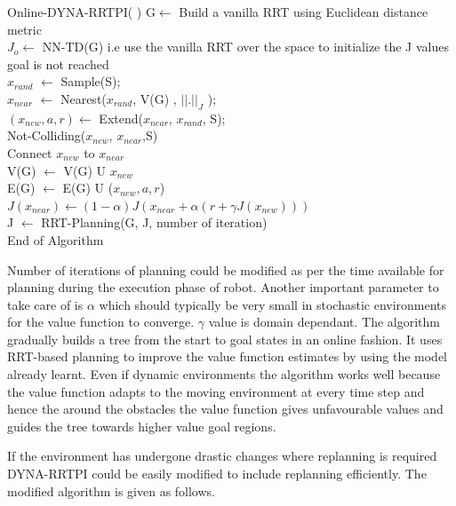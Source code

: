 \documentclass[MTech]{iitmdiss}
\begin{document}
\begin{algorithm}{Online-DYNA-RRTPI( )}{
\label{algo:Online DYNA-RRTPI}
}
G$\leftarrow$ Build a vanilla RRT using Euclidean distance metric\\
$J_o \leftarrow$ NN-TD(G) i.e use the vanilla RRT over the space to initialize the J values\\ 
\qwhile goal is not reached  \\
$x_{rand}$ $\leftarrow$ Sample(S);\\
$x_{near}$ $\leftarrow$ Nearest($x_{rand}$, V(G) , $|| . ||_J $ );\\
$(x_{new}, a, r) \leftarrow$ Extend($x_{near}$, $x_{rand}$, S);\\
\qif Not-Colliding($x_{new}$, $x_{near}$,S)\\
\qthen Connect $x_{new}$ to $x_{near}$\\
V(G) $\leftarrow$ V(G) U {$ x_{new}$ }\\
E(G) $\leftarrow$ E(G) U ($x_{new}, a, r$)\\
$J(x_{near}) \leftarrow (1 - \alpha) J (x_{near} + \alpha (r + \gamma J(x_{new})))$ \qfi\\
J $\leftarrow$ RRT-Planning(G, J, number of iteration)\qend\\
End of Algorithm
\end{algorithm}

Number of iterations of planning could be modified as per the time available for planning during the execution phase of robot.  Another important parameter to take care of is $\alpha$ which should typically be very small in stochastic environments for the value function to converge. $\gamma$ value is domain dependant.  The algorithm gradually builds a tree from the start to goal states in an online fashion. It uses  RRT-based planning to improve the value function estimates by using the model already learnt. Even if dynamic environments the algorithm works well because the value function adapts to the moving environment at every time step and hence the around the obstacles the value function gives unfavourable values and guides the tree towards higher value goal regions. 

If the environment has undergone drastic changes where replanning is required DYNA-RRTPI could be easily modified to include replanning efficiently. The modified algorithm is given as follows.
\end{document}
